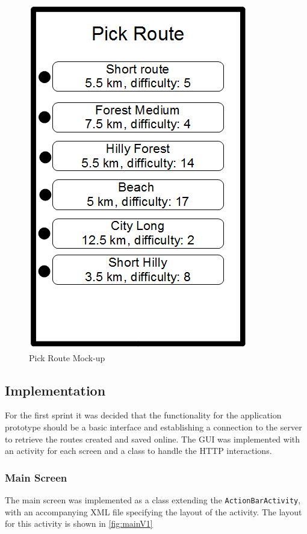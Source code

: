 \begin{figure}[ht]
\begin{center}
 \caption{Pick Route Mock-up}
 \label{fig:pickRouteMock}
 \includegraphics[scale=0.4]{img/pickRouteMock.png}
\end{center}
\end{figure}

\subsection{Implementation}
For the first sprint it was decided that the functionality for the application prototype should be a basic interface and establishing a connection to the server to retrieve the routes created and saved online. The \ac{GUI} was implemented with an activity for each screen and a class to handle the \ac{HTTP} interactions. 

\subsubsection{Main Screen}
The main screen was implemented as a class extending the \texttt{ActionBarActivity}, with an accompanying \ac{XML} file specifying the layout of the activity. The layout for this activity is shown in \autoref{fig:mainV1} 

